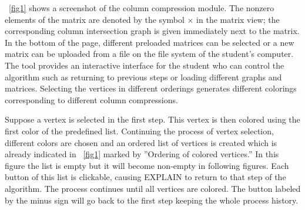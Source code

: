 \documentclass[12pt, twoside,a4paper,toc=bibliography]{scrbook}
\begin{document}
\figurename~\ref{fig1} shows a screenshot of the column compression module. The nonzero elements of the matrix are denoted by the symbol $\times$ in the matrix view; the corresponding column intersection graph is given immediately next to the matrix. In the bottom of the page, different preloaded matrices can be selected or a new matrix can be uploaded from a file on the file system of the student's computer. The tool provides an interactive interface for the student who can control the algorithm such as returning to previous steps or loading different graphs and matrices. Selecting the vertices in different orderings generates different colorings corresponding to different column compressions.

Suppose a vertex is selected in the first step. This vertex is then colored using the first color of the predefined list. Continuing the process of vertex selection, different colors are chosen and an ordered list of vertices is created which is already indicated in \figurename~\ref{fig1} marked by ''Ordering of colored vertices.'' In this figure the list is empty but it will become non-empty in following figures. Each button of this list is clickable, causing \mbox{EXPLAIN} to return to that step of the algorithm. The process continues until all vertices are colored. The button labeled by the minus sign will go back to the first step keeping the whole process history.
\end{document}
